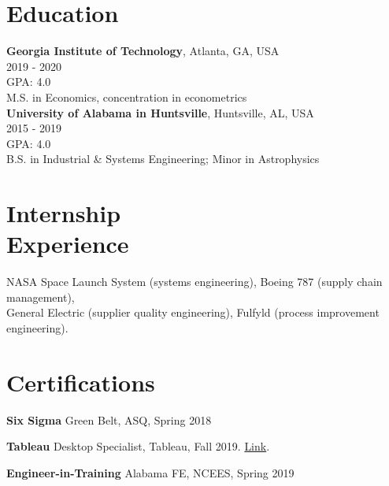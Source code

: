 \documentclass[margin,line]{res}
\begin{document}
\begin{resume}
\section{\sc Education}

{\bf Georgia Institute of Technology}, Atlanta, GA, USA\\
2019 - 2020\\
GPA: 4.0\\
M.S. in Economics, concentration in econometrics\\

\vspace{-.35cm}
{\bf University of Alabama in Huntsville}, Huntsville, AL, USA\\
2015 - 2019\\
GPA: 4.0\\
B.S. in Industrial \& Systems Engineering; Minor in Astrophysics\\


\vspace{-.35cm}
\section{\sc Internship \\ Experience}
NASA Space Launch System (systems engineering), Boeing 787 (supply chain management), \\ General Electric (supplier quality engineering), Fulfyld (process improvement engineering). 



\vspace{.25cm}



\vspace{.15cm}

\section{\sc Certifications}
{\bf Six Sigma} Green Belt, ASQ, Spring 2018
\vspace*{-3mm}

{\bf Tableau} Desktop Specialist, Tableau, Fall 2019. \href{https://www.credly.com/badges/e9a605a8-1977-4a1c-ab24-149a37c7fb36/linked_in_profile}{Link}.
\vspace*{-3mm}

{\bf Engineer-in-Training} Alabama FE, NCEES, Spring 2019
\vspace*{-3mm}


\end{resume}
\end{document}
